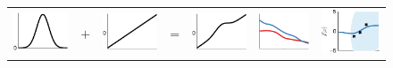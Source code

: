 \begin{figure}
\begin{tabular}{ccccc|c|c}
   \includegraphics[width=\fw]{../figures/structure_examples/se_kernel} & $+$ & \includegraphics[width=\fw]{../figures/structure_examples/lin_kernel} & = & \includegraphics[width=\fw]{../figures/structure_examples/se_plus_lin} & \includegraphics[width=\fw]{../figures/structure_examples/se_plus_lin_draws} & \includegraphics[width=\fw]{../figures/structure_examples/se_plus_lin_post} \\

\end{tabular}
\end{figure}
